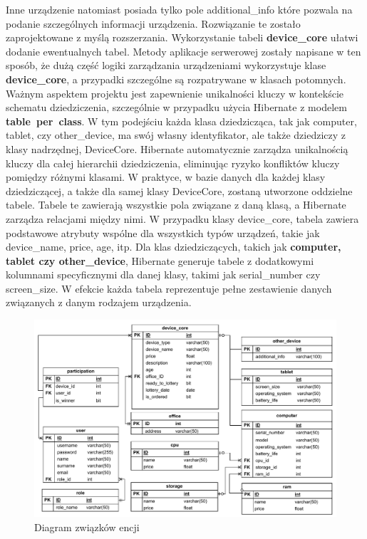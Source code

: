 Inne urządzenie natomiast posiada tylko pole additional\_info które pozwala na podanie szczególnych informacji urządzenia.
\newline
\newline
Rozwiązanie te zostało zaprojektowane z myślą rozszerzania. Wykorzystanie tabeli \textbf{device\_core} ułatwi dodanie ewentualnych tabel. Metody aplikacje serwerowej zostały napisane w ten sposób, że dużą część logiki zarządzania urządzeniami wykorzystuje klase \textbf{device\_core}, a przypadki szczególne są rozpatrywane w klasach potomnych.
Ważnym aspektem projektu jest zapewnienie unikalności kluczy w kontekście schematu dziedziczenia, szczególnie w przypadku użycia Hibernate z modelem \textbf{table~per~class}. W tym podejściu każda klasa dziedzicząca, tak jak computer, tablet, czy other\_device, ma swój własny identyfikator, ale także dziedziczy z klasy nadrzędnej, DeviceCore. Hibernate automatycznie zarządza unikalnością kluczy dla całej hierarchii dziedziczenia, eliminując ryzyko konfliktów kluczy pomiędzy różnymi klasami. W praktyce, w bazie danych dla każdej klasy dziedziczącej, a także dla samej klasy DeviceCore, zostaną utworzone oddzielne tabele. Tabele te zawierają wszystkie pola związane z daną klasą, a Hibernate zarządza relacjami między nimi. W przypadku klasy device\_core, tabela zawiera podstawowe atrybuty wspólne dla wszystkich typów urządzeń, takie jak device\_name, price, age, itp.
\newline
Dla klas dziedziczących, takich jak \textbf{computer, tablet czy other\_device}, Hibernate generuje tabele z dodatkowymi kolumnami specyficznymi dla danej klasy, takimi jak serial\_number czy screen\_size. W efekcie każda tabela reprezentuje pełne zestawienie danych związanych z danym rodzajem urządzenia.


\begin{figure}[h]
    \includegraphics[width=\linewidth]{rys04/ER_Diagram.pdf}
    \caption{Diagram związków encji}
    \label{ErDiagram_etykieta}
\end{figure}

